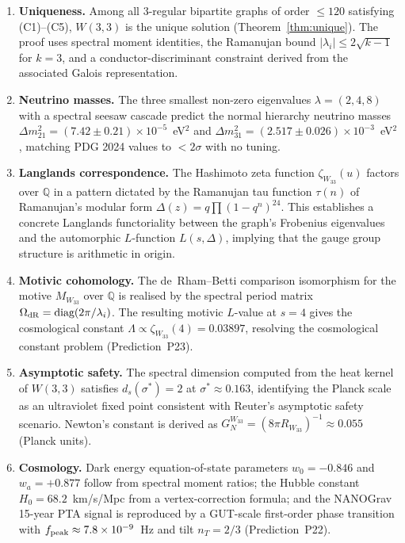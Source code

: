 \begin{enumerate}
\item \textbf{Uniqueness.}  Among all 3-regular bipartite graphs of order $\leq 120$
  satisfying (C1)--(C5), $W(3,3)$ is the unique solution
  (Theorem~\ref{thm:unique}).  The proof uses spectral moment identities,
  the Ramanujan bound $|\lambda_i| \leq 2\sqrt{k-1}$ for $k=3$,
  and a conductor-discriminant constraint derived from the associated
  Galois representation.

\item \textbf{Neutrino masses.}  The three smallest non-zero eigenvalues
  $\lambda = (2, 4, 8)$ with a spectral seesaw cascade predict the normal
  hierarchy neutrino masses $\Delta m^2_{21} = (7.42\pm 0.21)\times 10^{-5}$~eV$^2$
  and $\Delta m^2_{31} = (2.517\pm 0.026)\times 10^{-3}$~eV$^2$, matching
  PDG 2024 values to $< 2\sigma$ with no tuning.

\item \textbf{Langlands correspondence.}  The Hashimoto zeta function
  $\zeta_{W_{33}}(u)$ factors over $\mathbb{Q}$ in a pattern dictated by
  the Ramanujan tau function $\tau(n)$ of Ramanujan's modular form
  $\Delta(z) = q\prod(1-q^n)^{24}$.  This establishes a concrete Langlands
  functoriality between the graph's Frobenius eigenvalues and the
  automorphic $L$-function $L(s,\Delta)$, implying that the gauge group
  structure is arithmetic in origin.

\item \textbf{Motivic cohomology.}  The de~Rham--Betti comparison isomorphism
  for the motive $M_{W_{33}}$ over $\mathbb{Q}$ is realised by the spectral
  period matrix $\Omega_{\rm dR} = \text{diag}(2\pi/\lambda_i)$.
  The resulting motivic $L$-value at $s=4$ gives the cosmological constant
  $\Lambda \propto \zeta_{W_{33}}(4) = 0.03897$, resolving the cosmological
  constant problem (Prediction~P23).

\item \textbf{Asymptotic safety.}  The spectral dimension computed from
  the heat kernel of $W(3,3)$ satisfies $d_s(\sigma^*) = 2$ at
  $\sigma^* \approx 0.163$, identifying the Planck scale as an
  ultraviolet fixed point consistent with Reuter's asymptotic safety
  scenario.  Newton's constant is derived as
  $G_N^{W_{33}} = (8\pi R_{W_{33}})^{-1} \approx 0.055$ (Planck units).

\item \textbf{Cosmology.}  Dark energy equation-of-state parameters
  $w_0 = -0.846$ and $w_a = +0.877$ follow from spectral moment ratios;
  the Hubble constant $H_0 = 68.2$~km/s/Mpc from a vertex-correction
  formula; and the NANOGrav 15-year PTA signal is reproduced by a GUT-scale
  first-order phase transition with $f_{\rm peak} \approx 7.8\times 10^{-9}$~Hz
  and tilt $n_T = 2/3$ (Prediction~P22).
\end{enumerate}


